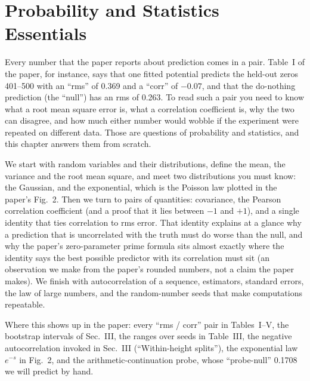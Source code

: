 \chapter{Probability and Statistics Essentials}\label{ch:probability}

\begin{chapterintro}
Every number that the paper reports about prediction comes in a pair. Table~I of the paper, for instance, says that one fitted potential predicts the held-out zeros 401--500 with an ``rms'' of 0.369 and a ``corr'' of $-0.07$, and that the do-nothing prediction (the ``null'') has an rms of 0.263. To read such a pair you need to know what a root mean square error is, what a correlation coefficient is, why the two can disagree, and how much either number would wobble if the experiment were repeated on different data. Those are questions of probability and statistics, and this chapter answers them from scratch.

We start with random variables and their distributions, define the mean, the variance and the root mean square, and meet two distributions you must know: the Gaussian, and the exponential, which is the Poisson law plotted in the paper's Fig.~2. Then we turn to pairs of quantities: covariance, the Pearson correlation coefficient (and a proof that it lies between $-1$ and $+1$), and a single identity that ties correlation to rms error. That identity explains at a glance why a prediction that is uncorrelated with the truth must do worse than the null, and why the paper's zero-parameter prime formula sits almost exactly where the identity says the best possible predictor with its correlation must sit (an observation we make from the paper's rounded numbers, not a claim the paper makes). We finish with autocorrelation of a sequence, estimators, standard errors, the law of large numbers, and the random-number seeds that make computations repeatable.

Where this shows up in the paper: every ``rms / corr'' pair in Tables~I--V, the bootstrap intervals of Sec.~III, the ranges over seeds in Table~III, the negative autocorrelation invoked in Sec.~III (``Within-height splits''), the exponential law $e^{-s}$ in Fig.~2, and the arithmetic-continuation probe, whose ``probe-null'' 0.1708 we will predict by hand.
\end{chapterintro}

